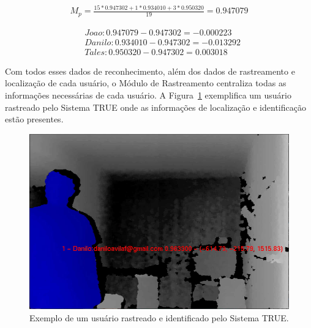 	\begin{align}
		\label{eq:joao}
		M_p = \frac{15 * 0.947302 + 1 * 0.934010 + 3 * 0.950320}{19} = 0.947079
	\end{align}

	\begin{align}
		\label{eq:joao2}
	 	& Joao: 0.947079 - 0.947302 = -0.000223\\
		\nonumber & Danilo: 0.934010 - 0.947302 = -0.013292\\
		\nonumber & Tales: 0.950320 - 0.947302 = 0.003018
	\end{align}

	Com todos esses dados de reconhecimento, além dos dados de rastreamento e localização de cada usuário, o Módulo de Rastreamento centraliza todas as informações necessárias de cada usuário. A Figura~\ref{fig:truetotal} exemplifica um usuário rastreado pelo Sistema TRUE onde as informações de localização e identificação estão presentes.

	\begin{figure}[htb]
			\begin{center}
				\includegraphics[scale=0.5]{figuras/4.ProblemaEProposta/user-reconhecido.png}
			\end{center}
			\caption{Exemplo de um usuário rastreado e identificado pelo Sistema TRUE.}
			\label{fig:truetotal}
		\end{figure}

